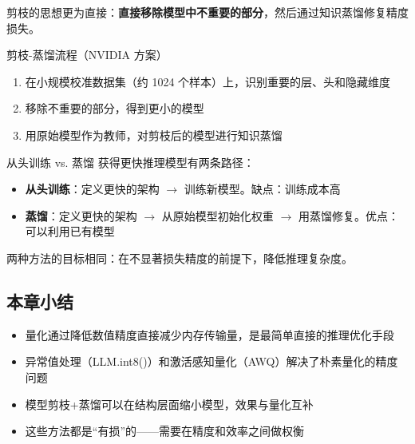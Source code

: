 剪枝的思想更为直接：\textbf{直接移除模型中不重要的部分}，然后通过知识蒸馏修复精度损失。

\begin{importantbox}{剪枝-蒸馏流程（NVIDIA 方案）}
\begin{enumerate}
    \item 在小规模校准数据集（约 1024 个样本）上，识别重要的层、头和隐藏维度
    \item 移除不重要的部分，得到更小的模型
    \item 用原始模型作为教师，对剪枝后的模型进行知识蒸馏
\end{enumerate}
\end{importantbox}

\begin{knowledgebox}{从头训练 vs. 蒸馏}
获得更快推理模型有两条路径：
\begin{itemize}
    \item \textbf{从头训练}：定义更快的架构 $\rightarrow$ 训练新模型。缺点：训练成本高
    \item \textbf{蒸馏}：定义更快的架构 $\rightarrow$ 从原始模型初始化权重 $\rightarrow$ 用蒸馏修复。优点：可以利用已有模型
\end{itemize}
两种方法的目标相同：在不显著损失精度的前提下，降低推理复杂度。
\end{knowledgebox}

\subsection{本章小结}

\begin{itemize}
    \item 量化通过降低数值精度直接减少内存传输量，是最简单直接的推理优化手段
    \item 异常值处理（LLM.int8()）和激活感知量化（AWQ）解决了朴素量化的精度问题
    \item 模型剪枝+蒸馏可以在结构层面缩小模型，效果与量化互补
    \item 这些方法都是``有损''的——需要在精度和效率之间做权衡
\end{itemize}


